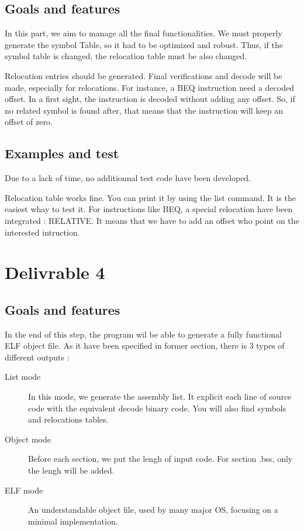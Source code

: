 \documentclass[twoside,twocolumn]{article}
\begin{document}
\subsection{Goals and features}
In this part, we aim to manage all the final functionalities. We must properly generate the symbol Table, so it had to be optimized and robust. Thus, if the symbol table is changed, the relocation table must be also changed.

Relocation entries should be generated. Final verifications and decode will be made, especially for relocations. For instance, a BEQ instruction need a decoded offset. In a first sight, the instruction is decoded without adding any offset. So, if no related symbol is found after, that means that the instruction will keep an offset of zero.

\subsection{Examples and test}

Due to a lack of time, no additionnal test code have been developed.

Relocation table works fine. You can print it by using the list command. It is the easiest whay to test it. For instructions like BEQ, a special relocation have been integrated : RELATIVE. It means that we have to add an offset who point on the interested intruction.



\section{Delivrable 4}

\subsection{Goals and features}
In the end of this step, the program wil be able to generate a fully functional ELF object file.
As it have been specified in former section, there is 3 types of different outputs :

\begin{description}
 \item[List mode] In this mode, we generate the assembly list. It explicit each line of source code with the equivalent decode binary code. You will also find symbols and relocations tables.
 \item[Object mode] Before each section, we put the lengh of input code. For section .bss, only the lengh will be added.
 \item[ELF mode] An understandable object file, used by many major OS, focusing on a minimal implementation.
\end{description}
\end{document}
